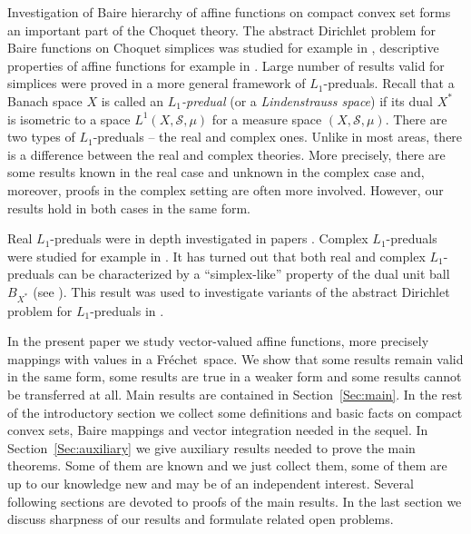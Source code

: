 \documentclass{amsart}
\numberwithin{equation}{section}
\theoremstyle{definition}
\def\ms{\mathcal S}
\newcommand{\fr}{Fr\'echet\ }
\begin{document}
Investigation of Baire hierarchy of affine functions on compact convex set forms an important
part of the Choquet theory. The abstract Dirichlet problem for Baire functions on Choquet simplices
was studied for example in \cite{Jel,spurny-cejm,spurny-aus,spu-ka,spu-aus}, descriptive properties of affine functions for example in \cite{lusp,lusp2,lusp-complex,spu-zel}. Large number of results valid for simplices were proved in a more general framework of $L_1$-preduals.
Recall that a Banach space $X$ is called an \emph{$L_1$-predual} (or a \emph{Lindenstrauss space}) if its dual $X^*$ is isometric to a space $L^1(X,\ms,\mu)$ for a measure space $(X,\ms,\mu)$. There are two types of $L_1$-preduals -- the real and complex ones. Unlike in most areas, there is a difference between the real and complex theories. More precisely, there are some results known in the real case and unknown in the complex case and, moreover, proofs in the complex setting are often more involved. However, our results hold in both cases in the same form.

Real $L_1$-preduals were in depth investigated in
papers \cite{effros-real,fakhoury1,fakhoury2,bednar1972concerning,Lau1973,lusky1977separable,fonf1978massiveness,lusky-comp,
dieckmann1994korovkin,gasparis2002contractively,castillo2009extending,lusp}.
Complex $L_1$-preduals were studied  for example in \cite{wu76,nielsenolsen,wu78,roy1979convex,rao82,limaroy,rao85,kranti,utter,lusky-compl,dulin}.
It has turned out that both real and complex $L_1$-preduals can be characterized by a ``simplex-like'' property of the dual unit ball $B_{X^*}$ (see \cite{lazar,effros}). This result was used to investigate variants of the abstract Dirichlet problem for $L_1$-preduals in \cite{lusp23,lusp2,lusp-complex}.


In the present paper we study vector-valued affine functions, more precisely mappings with values in a \fr space. We show that some results remain valid in the same form, some results are true in a weaker form and some results cannot be transferred at all. Main results are contained in Section~\ref{Sec:main}. In the rest of the introductory section we collect some definitions and basic facts on compact convex sets, Baire mappings and vector integration needed in the sequel. In Section~\ref{Sec:auxiliary} we give auxiliary results needed to prove the main theorems. Some of them are known and we just collect them, some of them are up to our knowledge new and may be of an independent interest.
Several following sections are devoted to proofs of the main results. In the last section we discuss sharpness of our results and formulate related open problems.
\end{document}
